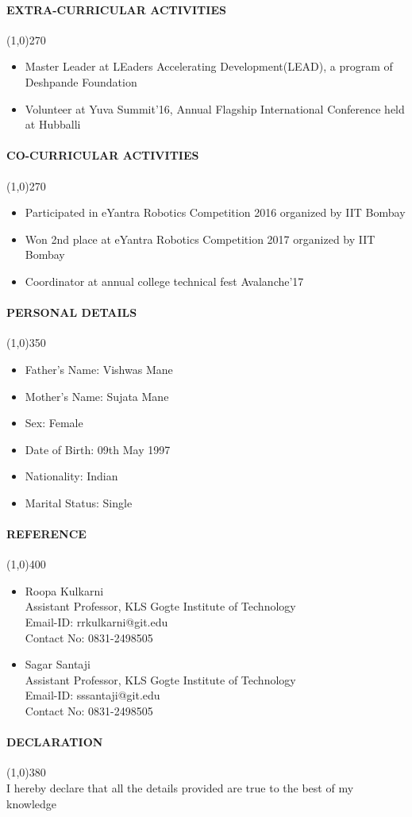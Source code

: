 \documentclass[12pt,a4paper]{article}
\begin{document}
\paragraph{EXTRA-CURRICULAR ACTIVITIES}
	\line(1,0){270}
	\begin{itemize}
		\item Master Leader at LEaders Accelerating Development(LEAD), a program of Deshpande Foundation
		\item Volunteer at Yuva Summit'16, Annual Flagship International Conference held at Hubballi
	\end{itemize}
\paragraph{CO-CURRICULAR ACTIVITIES}
	\line(1,0){270}
	\begin{itemize}
		\item Participated in eYantra Robotics Competition 2016 organized by IIT Bombay
		\item Won 2nd place at eYantra Robotics Competition 2017 organized by IIT Bombay
		\item Coordinator at annual college technical fest Avalanche'17
	\end{itemize}
\paragraph{PERSONAL DETAILS}
	\line(1,0){350}
	\begin{itemize}
		\item Father's Name: Vishwas Mane
		\item Mother's Name: Sujata Mane
		\item Sex: Female
		\item Date of Birth: 09th May 1997
		\item Nationality: Indian
		\item Marital Status: Single
	\end{itemize}
\paragraph{REFERENCE}
	\line(1,0){400}
	\begin{itemize}
		\item Roopa Kulkarni\\
		Assistant Professor, KLS Gogte Institute of Technology\\
		Email-ID: rrkulkarni@git.edu\\
		Contact No: 0831-2498505
		\item Sagar Santaji\\
		Assistant Professor, KLS Gogte Institute of Technology\\
		Email-ID: sssantaji@git.edu\\
		Contact No: 0831-2498505
		
	\end{itemize}
\paragraph{DECLARATION}
	\line(1,0){380}\\
	I hereby declare that all the details provided are true to the best of my knowledge
\end{document}
